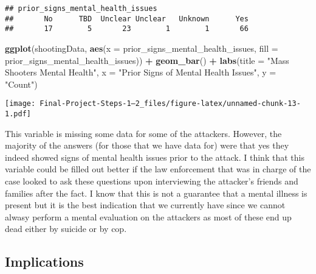 \documentclass[
]{article}
\newenvironment{Shaded}{\begin{snugshade}}{\end{snugshade}}
\newcommand{\AttributeTok}[1]{\textcolor[rgb]{0.13,0.29,0.53}{#1}}
\newcommand{\FunctionTok}[1]{\textcolor[rgb]{0.13,0.29,0.53}{\textbf{#1}}}
\newcommand{\NormalTok}[1]{#1}
\newcommand{\SpecialCharTok}[1]{\textcolor[rgb]{0.81,0.36,0.00}{\textbf{#1}}}
\newcommand{\StringTok}[1]{\textcolor[rgb]{0.31,0.60,0.02}{#1}}
\begin{document}
\begin{verbatim}
## prior_signs_mental_health_issues
##       No      TBD  Unclear Unclear   Unknown      Yes 
##       17        5       23        1        1       66
\end{verbatim}

\begin{Shaded}
\begin{Highlighting}[]
\FunctionTok{ggplot}\NormalTok{(shootingData, }\FunctionTok{aes}\NormalTok{(}\AttributeTok{x =}\NormalTok{ prior\_signs\_mental\_health\_issues, }
                         \AttributeTok{fill =}\NormalTok{ prior\_signs\_mental\_health\_issues)) }\SpecialCharTok{+} \FunctionTok{geom\_bar}\NormalTok{() }\SpecialCharTok{+} 
  \FunctionTok{labs}\NormalTok{(}\AttributeTok{title =} \StringTok{"Mass Shooters\textquotesingle{} Mental Health"}\NormalTok{, }
       \AttributeTok{x =} \StringTok{"Prior Signs of Mental Health Issues"}\NormalTok{, }\AttributeTok{y =} \StringTok{"Count"}\NormalTok{)}
\end{Highlighting}
\end{Shaded}

\texttt{[image: Final-Project-Steps-1---2\_files/figure-latex/unnamed-chunk-13-1.pdf]}

This variable is missing some data for some of the attackers. However,
the majority of the answers (for those that we have data for) were that
yes they indeed showed signs of mental health issues prior to the
attack. I think that this variable could be filled out better if the law
enforcement that was in charge of the case looked to ask these questions
upon interviewing the attacker's friends and families after the fact. I
know that this is not a guarantee that a mental illness is present but
it is the best indication that we currently have since we cannot alwasy
perform a mental evaluation on the attackers as most of these end up
dead either by suicide or by cop.

\subsection{Implications}\label{implications}
\end{document}
